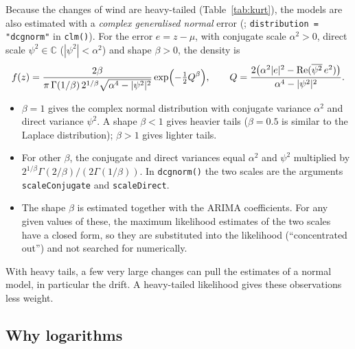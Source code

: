 \documentclass[11pt,a4paper]{article}
\newcommand{\code}[1]{\texttt{#1}}
\newcommand{\1}{\mathbf{1}}
\renewcommand{\Re}{\operatorname{Re}}
\begin{document}
Because the changes of wind are heavy-tailed (Table~\ref{tab:kurt}), the models are also
estimated with a \emph{complex generalised normal} error (\citealp{novey2010};
\code{distribution = "dcgnorm"} in \code{clm()}). For the error $e = z - \mu$, with conjugate
scale $\alpha^2 > 0$, direct scale $\psi^2 \in \mathbb{C}$ ($|\psi^2| < \alpha^2$) and shape
$\beta > 0$, the density is
\begin{equation}\label{eq:cgnorm}
  f(z) = \frac{2\beta}{\pi\,\Gamma(1/\beta)\, 2^{1/\beta}\sqrt{\alpha^4 - |\psi^2|^2}}
         \exp\Bigl(-\tfrac12 Q^\beta\Bigr),
  \qquad
  Q = \frac{2\bigl(\alpha^2|e|^2 - \Re(\overline{\psi^2}\, e^2)\bigr)}{\alpha^4 - |\psi^2|^2}.
\end{equation}
\begin{itemize}
  \item $\beta = 1$ gives the complex normal distribution with conjugate variance $\alpha^2$ and
    direct variance $\psi^2$. A shape $\beta < 1$ gives heavier tails ($\beta = 0.5$ is similar to
    the Laplace distribution); $\beta > 1$ gives lighter tails.
  \item For other $\beta$, the conjugate and direct variances equal $\alpha^2$ and $\psi^2$
    multiplied by $2^{1/\beta}\Gamma(2/\beta) / (2\Gamma(1/\beta))$. In \code{dcgnorm()} the two scales
    are the arguments \code{scaleConjugate} and \code{scaleDirect}.
  \item The shape $\beta$ is estimated together with the ARIMA coefficients. For any given values
    of these, the maximum likelihood estimates of the two scales have a closed form, so
    they are substituted into the likelihood (``concentrated out'') and not searched for
    numerically.
\end{itemize}
With heavy tails, a few very large changes can pull the estimates of a normal model, in
particular the drift. A heavy-tailed likelihood gives these observations less weight.

\subsection{Why logarithms}\label{sec:log}
\end{document}
